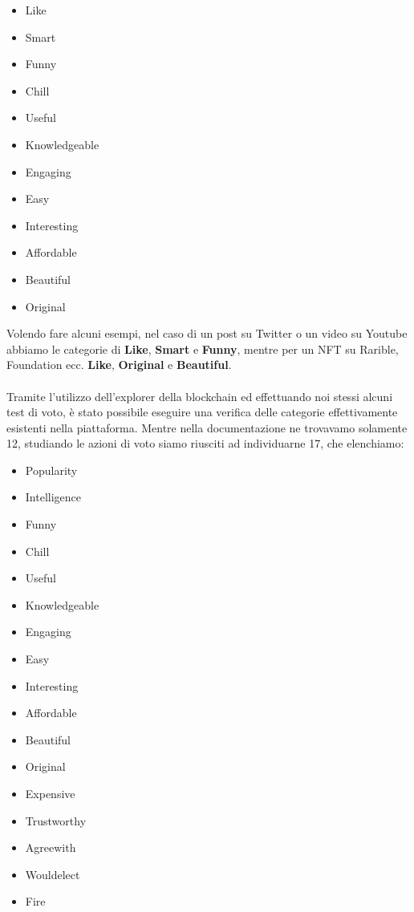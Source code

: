 \begin{multicols}{3}
    \begin{itemize}
        \item Like
        \item Smart
        \item Funny
        \item Chill
        \item Useful
        \item Knowledgeable
        \item Engaging
        \item Easy
        \item Interesting
        \item Affordable
        \item Beautiful
        \item Original
    \end{itemize}
\end{multicols}

Volendo fare alcuni esempi, nel caso di un post su Twitter o un video su Youtube abbiamo le categorie di \textbf{Like}, \textbf{Smart} e \textbf{Funny}, mentre per un NFT su Rarible, Foundation ecc. \textbf{Like}, \textbf{Original} e \textbf{Beautiful}.
\\
\\
Tramite l'utilizzo dell'explorer della blockchain ed effettuando noi stessi alcuni test di voto, è stato possibile eseguire una verifica delle categorie effettivamente esistenti nella piattaforma. Mentre nella documentazione ne trovavamo solamente 12, studiando le azioni di voto siamo riusciti ad individuarne 17, che elenchiamo:

\begin{multicols}{3}
    \begin{itemize}
        \item Popularity
        \item Intelligence
        \item Funny
        \item Chill
        \item Useful
        \item Knowledgeable
        \item Engaging
        \item Easy
        \item Interesting
        \item Affordable
        \item Beautiful
        \item Original
        \item Expensive
        \item Trustworthy
        \item Agreewith
        \item Wouldelect
        \item Fire
    \end{itemize}
\end{multicols}

